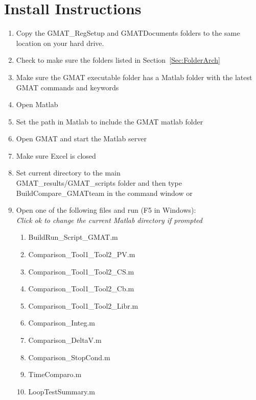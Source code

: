 \section{Install Instructions}
\begin{enumerate}
  \item Copy the GMAT\_RegSetup and GMATDocuments folders to the same location on your hard drive.
  \item Check to make sure the folders listed in Section~\ref{Sec:FolderArch}
  \item Make sure the GMAT executable folder has a Matlab folder with the latest GMAT commands
and keywords
  \item Open Matlab
  \item Set the path in Matlab to include the GMAT matlab folder
  \item Open GMAT and start the Matlab server
  \item Make sure Excel is closed
  \item Set current directory to the main\\
  GMAT\_results/GMAT\_scripts folder and then
  type BuildCompare\_GMATteam in the command window or
  \item Open one of the following files and run (F5 in Windows):\\
\emph{Click ok to change the current Matlab directory if prompted}
    \begin{enumerate}
    \item BuildRun\_Script\_GMAT.m
    \item Comparison\_Tool1\_Tool2\_PV.m
    \item Comparison\_Tool1\_Tool2\_CS.m
    \item Comparison\_Tool1\_Tool2\_Cb.m
    \item Comparison\_Tool1\_Tool2\_Libr.m
    \item Comparison\_Integ.m
    \item Comparison\_DeltaV.m
    \item Comparison\_StopCond.m
    \item TimeComparo.m
    \item LoopTestSummary.m
    \end{enumerate}
\end{enumerate}

